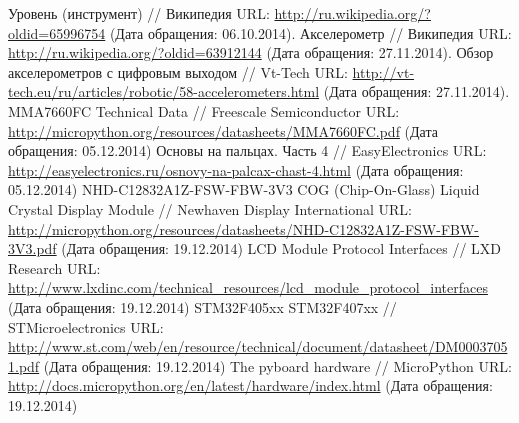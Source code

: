 \documentclass[document.tex]{subfiles}
\begin{document}
\clearpage
{}
\begin{thebibliography}{@@@@}	
		Уровень (инструмент) // Википедия
		URL: {\url{http://ru.wikipedia.org/?oldid=65996754}} 
		(Дата обращения: 06.10.2014).
		Акселерометр // Википедия
		URL: {\url{http://ru.wikipedia.org/?oldid=63912144}}
		(Дата обращения: 27.11.2014).
		Обзор акселерометров с цифровым выходом // Vt-Tech
		URL: {\url{http://vt-tech.eu/ru/articles/robotic/58-accelerometers.html}}
		(Дата обращения: 27.11.2014).
		MMA7660FC Technical Data // Freescale Semiconductor
		URL: {\url{http://micropython.org/resources/datasheets/MMA7660FC.pdf}}
		(Дата обращения: 05.12.2014)
		Основы на пальцах. Часть 4 // EasyElectronics
		URL: {\url{http://easyelectronics.ru/osnovy-na-palcax-chast-4.html}}
		(Дата обращения: 05.12.2014)
		NHD-C12832A1Z-FSW-FBW-3V3 COG (Chip-On-Glass) Liquid Crystal Display Module // Newhaven Display International
		URL: {\url{http://micropython.org/resources/datasheets/NHD-C12832A1Z-FSW-FBW-3V3.pdf}}
		(Дата обращения: 19.12.2014)
		LCD Module Protocol Interfaces // LXD Research
		URL: {\url{http://www.lxdinc.com/technical_resources/lcd_module_protocol_interfaces}}
		(Дата обращения: 19.12.2014)
		STM32F405xx STM32F407xx // STMicroelectronics
		URL: {\url{http://www.st.com/web/en/resource/technical/document/datasheet/DM00037051.pdf}}
		(Дата обращения: 19.12.2014)
		The pyboard hardware // MicroPython
		URL: {\url{http://docs.micropython.org/en/latest/hardware/index.html}}
		(Дата обращения: 19.12.2014)
	\end{thebibliography}
\end{document}
